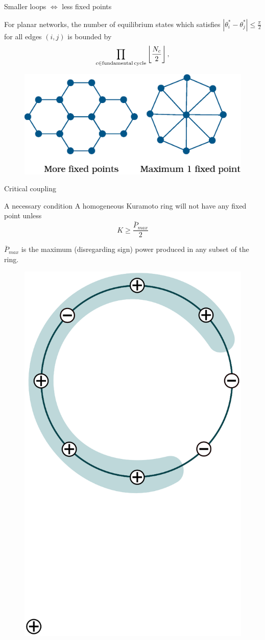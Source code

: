 \documentclass[xcolor=x11names,compress]{beamer}
\renewcommand{\(}{\begin{columns}}
\renewcommand{\)}{\end{columns}}
\newcommand{\<}[1]{\begin{column}{#1}}
\renewcommand{\>}{\end{column}}
\newcommand{\be}{\begin{equation}}
\newcommand{\ee}{\end{equation}}
\begin{document}
\begin{frame}{Smaller loops $\Leftrightarrow$ less fixed points}

\begin{theorem}
For planar networks, the number of equilibrium states which satisfies 
$\left|\theta_i^*  - \theta_j^*\right|\leq \frac{\pi}{2}$ for all edges $(i,j)$
is bounded by
\be
   \prod_{c \in \rm{fundamental \, cycle}} \left\lfloor \frac{N_c}{2} \right \rfloor,
   \label{eqn:numsol-cycle}
\ee
\end{theorem}

\begin{figure}
\begin{center}
\includegraphics[width=0.8\columnwidth]{graph_faces_comp}
\end{center}
\end{figure}

\end{frame}

\begin{frame}{Critical coupling}
\begin{block}{A necessary condition}
A homogeneous Kuramoto ring will not have any fixed point unless
\[
K\geq\frac{\bar{P}_{max}}{2}
\]
\end{block}
$\bar{P}_{max}$ is the maximum (disregarding sign) power produced 
in any subset of the ring.  
\begin{figure}
\begin{center}
\includegraphics[width=0.3\columnwidth]{ring}
\end{center}
\end{figure}
\end{frame}
\end{document}
